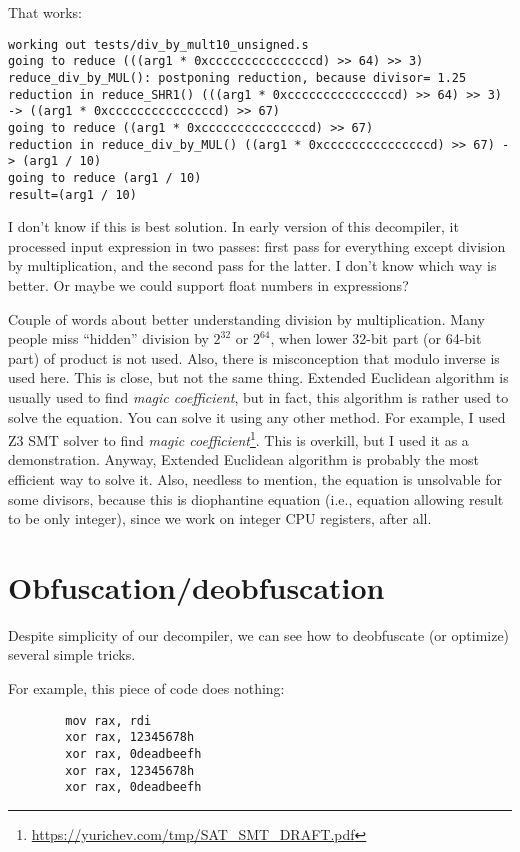 ﻿\documentclass[12pt]{article}
\begin{document}
That works:

\begin{lstlisting}
working out tests/div_by_mult10_unsigned.s
going to reduce (((arg1 * 0xcccccccccccccccd) >> 64) >> 3)
reduce_div_by_MUL(): postponing reduction, because divisor= 1.25
reduction in reduce_SHR1() (((arg1 * 0xcccccccccccccccd) >> 64) >> 3) -> ((arg1 * 0xcccccccccccccccd) >> 67)
going to reduce ((arg1 * 0xcccccccccccccccd) >> 67)
reduction in reduce_div_by_MUL() ((arg1 * 0xcccccccccccccccd) >> 67) -> (arg1 / 10)
going to reduce (arg1 / 10)
result=(arg1 / 10)
\end{lstlisting}

I don't know if this is best solution. In early version of this decompiler, it processed input expression in two passes:
first pass for everything except division by multiplication, and the second pass for the latter.
I don't know which way is better.
Or maybe we could support float numbers in expressions?

Couple of words about better understanding division by multiplication.
Many people miss ``hidden'' division by $2^{32}$ or $2^{64}$,
when lower 32-bit part (or 64-bit part) of product is not used.
Also, there is misconception that modulo inverse is used here. This is close, but not the same thing.
Extended Euclidean algorithm is usually used to find \textit{magic coefficient}, but in fact,
this algorithm is rather used to solve the equation. You can solve it using any other method.
For example, I used Z3 SMT solver to find \textit{magic coefficient}\footnote{\url{https://yurichev.com/tmp/SAT_SMT_DRAFT.pdf}}.
This is overkill, but I used it as a demonstration.
Anyway, Extended Euclidean algorithm is probably the most efficient way to solve it.
Also, needless to mention, the equation is unsolvable for some divisors, because this is diophantine equation
(i.e., equation allowing result to be only integer), since we work on integer CPU registers, after all.

\section{Obfuscation/deobfuscation}

Despite simplicity of our decompiler, we can see how to deobfuscate (or optimize) several simple tricks.

For example, this piece of code does nothing:

\begin{lstlisting}
        mov rax, rdi
        xor rax, 12345678h
        xor rax, 0deadbeefh
        xor rax, 12345678h
        xor rax, 0deadbeefh
\end{lstlisting}
\end{document}
